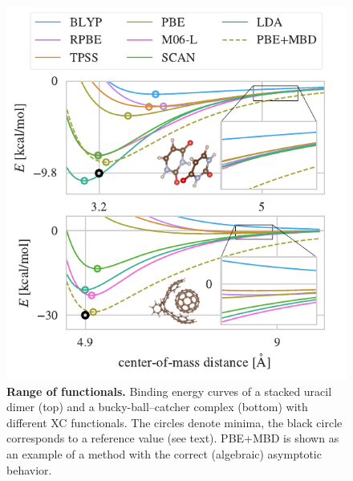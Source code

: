 \begin{figure}[t!]
\includegraphics[center]{media/range-curves}
\caption{\textbf{Range of functionals.}
Binding energy curves of a stacked uracil dimer (top) and a bucky-ball--catcher complex (bottom) with different XC functionals.
The circles denote minima, the black circle corresponds to a reference value (see text).
PBE+MBD is shown as an example of a method with the correct (algebraic) asymptotic behavior.
}\label{fig:range}
\end{figure}

